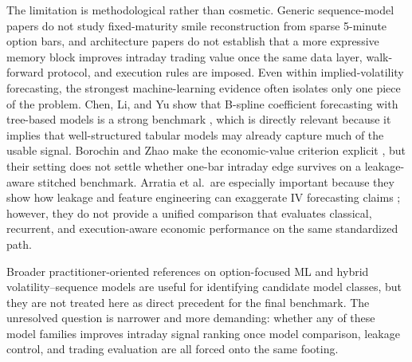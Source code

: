 \documentclass[12pt]{report}
\begin{document}
The limitation is methodological rather than cosmetic. Generic sequence-model papers do not study fixed-maturity smile reconstruction from sparse 5-minute option bars, and architecture papers do not establish that a more expressive memory block improves intraday trading value once the same data layer, walk-forward protocol, and execution rules are imposed. Even within implied-volatility forecasting, the strongest machine-learning evidence often isolates only one piece of the problem. Chen, Li, and Yu show that B-spline coefficient forecasting with tree-based models is a strong benchmark \citep{chen2024bspline}, which is directly relevant because it implies that well-structured tabular models may already capture much of the usable signal. Borochin and Zhao make the economic-value criterion explicit \citep{borochin2025}, but their setting does not settle whether one-bar intraday edge survives on a leakage-aware stitched benchmark. Arratia et al.\ are especially important because they show how leakage and feature engineering can exaggerate IV forecasting claims \citep{arratia2025}; however, they do not provide a unified comparison that evaluates classical, recurrent, and execution-aware economic performance on the same standardized path.

Broader practitioner-oriented references on option-focused ML and hybrid volatility--sequence models \citep{hull2019framing,sullivan2019lstm,zhao2024garchlstm} are useful for identifying candidate model classes, but they are not treated here as direct precedent for the final benchmark. The unresolved question is narrower and more demanding: whether any of these model families improves intraday signal ranking once model comparison, leakage control, and trading evaluation are all forced onto the same footing.
\end{document}
